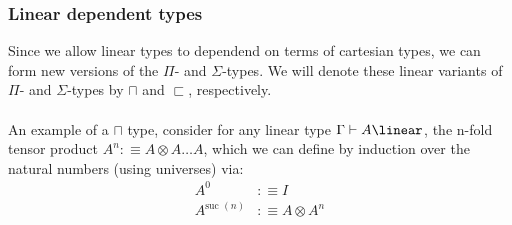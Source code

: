 \subsubsection{Linear dependent types}
Since we allow linear types to dependend on terms of cartesian types, we can form new versions of the $\Pi$- and $\Sigma$-types. We will denote these linear variants of $\Pi$- and $\Sigma$-types by $\sqcap$ and $\sqsubset$, respectively.\\
\\
An example of a $\sqcap$ type, consider for any linear type $\Gamma \vdash A \linear$, the n-fold tensor product $A^n :\equiv A \otimes A \dots A$, which we can define by induction over the natural numbers (using universes) via:
\[
  \begin{split}
  A^0 &:\equiv I\\
  A^{\text{suc }(n)} &:\equiv A \otimes A^n
  \end{split}
\]
